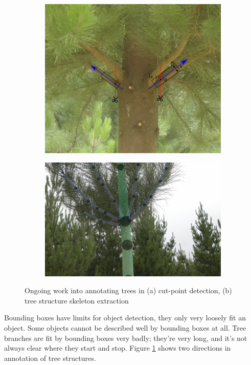 \begin{figure}[h!]
\begin{subfigure}[t]{1.0\linewidth}
  \centering
  \includegraphics[width=0.8\linewidth]{figures/future/tree_cutpoint.pdf}
  \caption{} 
\end{subfigure}

\begin{subfigure}[t]{1.0\linewidth}
  \centering
  \includegraphics[width=0.8\linewidth]{figures/future/tree_branches.jpg}
  \caption{} 
\end{subfigure}
\caption{Ongoing work into annotating trees in (a) cut-point detection, (b) tree structure skeleton extraction }
\label {fig:future_trees}
\end{figure}

Bounding boxes have limits for object detection, they only very loosely fit an object. Some objects cannot be described well by bounding boxes at all. Tree branches are fit by bounding boxes very badly; they're very long, and it's not always clear where they start and stop. Figure \ref{fig:future_trees} shows two directions in annotation of tree structures. 

